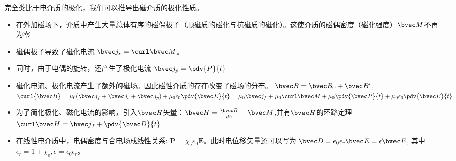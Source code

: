 
完全类比于电介质的极化，我们可以推导出磁介质的极化性质。

\begin{itemize}
\item 在外加磁场下，介质中产生大量总体有序的磁偶极子（顺磁质的磁化与抗磁质的磁化）。这使介质的磁偶密度（磁化强度）$\bvec M$不再为零

\item 磁偶极子导致了磁化电流 $\bvec j_s = \curl \bvec M$。
\item 同时，由于电偶的旋转，还产生了极化电流 $\bvec j_p = \pdv{P}{t}$  %

\item 磁化电流、极化电流产生了额外的磁场。因此磁性介质的存在改变了磁场的分布。 $\bvec B = \bvec B_0 + \bvec B'$, $\curl {\bvec B} = \mu_0 (\bvec j_f + \bvec j_s + \bvec j_p) + \mu_0\epsilon_0 \pdv{\bvec E}{t} = \mu_0 \bvec j_f + \mu_0 \curl \bvec M + \mu_0 \pdv{\bvec P}{t} + \mu_0 \epsilon_0 \pdv{\bvec E}{t}$

\item 为了简化极化、磁化电流的影响，引入$\bvec H$矢量：$\bvec H = \frac{\bvec B}{\mu_0} - \bvec M$,并有$\bvec H$的环路定理 $\curl \bvec H = \bvec j_f + \pdv{\bvec D}{t}$

\item 在线性电介质中，电偶密度与合电场成线性关系: $\mathbf P=\chi_{\mathrm e} \varepsilon_{0} \mathbf E$。此时电位移矢量还可以写为 $\bvec D = \epsilon_0 \epsilon_r \bvec E = \epsilon \bvec E $, 其中$\epsilon_r = 1+\chi_{\mathrm e}, \epsilon = \epsilon_0 \epsilon_r$。
\end{itemize}